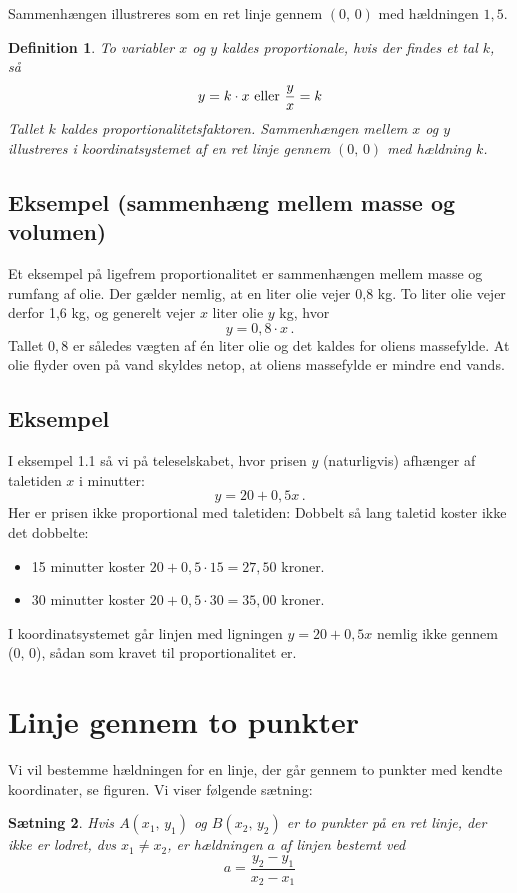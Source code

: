\documentclass[12pt,oneside,a4paper]{article}
\newtheorem{thm}{Sætning}[section]
\newtheorem{mydef}[thm]{Definition}
\begin{document}
Sammenhængen illustreres som en ret linje gennem $(0,\,0)$ med hældningen $1,5$.

\begin{mydef}
    To variabler $x$ og $y$ kaldes proportionale, hvis der findes et tal $k$, så
    $$
    y = k\cdot x \,\, {\rm eller} \,\, \frac{y}{x} = k
    $$
    Tallet $k$ kaldes proportionalitetsfaktoren. Sammenhængen mellem $x$ og $y$
    illustreres i koordinatsystemet af en ret linje gennem $(0,\,0)$ med 
    hældning $k$.
\end{mydef}

\subsection{Eksempel (sammenhæng mellem masse og volumen)}

Et eksempel på ligefrem proportionalitet er sammenhængen mellem masse og rumfang af olie.
Der gælder nemlig, at en liter olie vejer 0,8 kg. To liter olie vejer derfor 1,6 kg,
og generelt vejer $x$ liter olie $y$ kg, hvor
\[
y = 0,8 \cdot x \,.
\]
Tallet $0,8$ er således vægten af én liter olie og det kaldes for oliens
massefylde.  At olie flyder oven på vand skyldes netop, at oliens massefylde er
mindre end vands.

\subsection{Eksempel}
I eksempel 1.1 så vi på teleselskabet, hvor prisen $y$ (naturligvis) afhænger af
taletiden $x$ i minutter:
\[
y=20+0,5x \,.
\]
Her er prisen ikke proportional med taletiden: Dobbelt så lang taletid koster ikke
det dobbelte:
\begin{itemize}
    \item 15 minutter koster $20+0,5\cdot 15 = 27,50$ kroner.
    \item 30 minutter koster $20+0,5\cdot 30 = 35,00$ kroner.
\end{itemize}
I koordinatsystemet går linjen med ligningen $y=20+0,5x$ nemlig ikke gennem (0, 0),
sådan som kravet til proportionalitet er.



\section{Linje gennem to punkter}
Vi vil bestemme hældningen for en linje, der går gennem
to punkter med kendte koordinater, se figuren. Vi viser følgende sætning:
\begin{thm}
    Hvis $A(x_1,\,y_1)$ og $B(x_2,\,y_2)$ er to punkter på en ret linje, der ikke
    er lodret, dvs $x_1\neq x_2$, er hældningen $a$ af linjen bestemt ved
    $$
    a = \frac{y_2-y_1}{x_2-x_1}
    $$
\end{thm}
\end{document}
